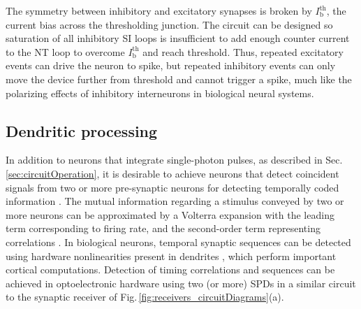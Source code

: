 \documentclass[aip,amsmath,amssymb,reprint,nofootinbib]{revtex4-1}
\begin{document}
The symmetry between inhibitory and excitatory synapses is broken by $I_{\mathrm{b}}^{\mathrm{th}}$, the current bias across the thresholding junction. The circuit can be designed so saturation of all inhibitory SI loops is insufficient to add enough counter current to the NT loop to overcome  $I_{\mathrm{b}}^{\mathrm{th}}$ and reach threshold. Thus, repeated excitatory events can drive the neuron to spike, but repeated inhibitory events can only move the device further from threshold and cannot trigger a spike, much like the polarizing effects of inhibitory interneurons in biological neural systems.
	
\subsection{\label{sec:dendriticProcessing}Dendritic processing}
In addition to neurons that integrate single-photon pulses, as described in Sec. \ref{sec:circuitOperation}, it is desirable to achieve neurons that detect coincident signals from two or more pre-synaptic neurons for detecting temporally coded information \cite{thde2001,sase2001,stse2007,sp2008,brcl2010,haah2015}. The mutual information regarding a stimulus conveyed by two or more neurons can be approximated by a Volterra expansion \cite{geki2002} with the leading term corresponding to firing rate, and the second-order term representing correlations \cite{pasc1999}. In biological neurons, temporal synaptic sequences can be detected using hardware nonlinearities present in dendrites \cite{brcl2010,haah2015}, which perform important cortical computations. Detection of timing correlations and sequences can be achieved in optoelectronic hardware using two (or more) SPDs in a similar circuit to the synaptic receiver of Fig.\,\ref{fig:receivers_circuitDiagrams}(a). 
\end{document}
